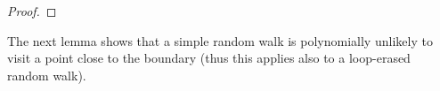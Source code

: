 \documentclass[11pt]{article}
\begin{document}
\begin{proof}
\end{proof}


The next lemma shows that a simple random walk is polynomially unlikely to visit a point close to the boundary (thus this applies also to a loop-erased random walk).
\end{document}
